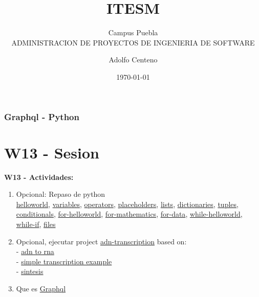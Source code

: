 \documentclass{beamer}
\begin{document}
\title{ITESM}  
\subtitle{Campus Puebla\\ADMINISTRACION DE PROYECTOS DE INGENIERIA DE SOFTWARE
}
\author{Adolfo Centeno}
\date{\today} 


\begin{frame}
\titlepage
\end{frame}

\begin{frame}\frametitle{Graphql - Python}
\tableofcontents
\end{frame} 


\section{W13 - Sesion }

\begin{frame}

    
\textbf{W13 - Actividades:}


\begin{enumerate}

\item
	Opcional: Repaso de python \\
	
    \href{https://github.com/adsoftsito/python/blob/master/w2/helloworld.py}{helloworld},
	\href{https://github.com/adsoftsito/python/blob/master/w2/variables.py}{variables},
	\href{https://github.com/adsoftsito/python/blob/master/w2/operators.py}{operators},
	\href{https://github.com/adsoftsito/python/blob/master/w2/placeholders.py}{placeholders},
	\href{https://github.com/adsoftsito/python/blob/master/w2/lists.py}{lists},
	\href{https://github.com/adsoftsito/python/blob/master/w3/dictionaries.py}{dictionaries},
	\href{https://github.com/adsoftsito/python/blob/master/w3/tuples.py}{tuples},
	\href{https://github.com/adsoftsito/python/blob/master/w3/conditionals.py}{conditionals},
	\href{https://github.com/adsoftsito/python/blob/master/w4/for-helloworld.py}{for-helloworld},
	\href{https://github.com/adsoftsito/python/blob/master/w4/for-math.py}{for-mathematics},
	\href{https://github.com/adsoftsito/python/blob/master/w4/for-data.py}{for-data},
	\href{https://github.com/adsoftsito/python/blob/master/w4/while-helloworld.py}{while-helloworld},
	\href{https://github.com/adsoftsito/python/blob/master/w4/while-conditional.py}{while-if},
	\href{https://github.com/adsoftsito/python/blob/master/w5/files.py}{files} 
	
\item
	Opcional, ejecutar project \href{https://github.com/adsoftsito/python/blob/master/w6/adnframes.py}{adn-transcription} based on:\\
	  - \href{https://www.youtube.com/watch?v=fA2Vp3qgfDM}{adn to rna} \\
      - \href{https://www.youtube.com/watch?v=iXNhQoLNtYo&t=382s}{simple transcription example} \\
      - \href{https://www.youtube.com/watch?v=VEy8TYGs4mA&t=478s}{sintesis}
\item
   Que es       
    \href{https://www.howtographql.com/basics/0-introduction/}{Graphql}


\end{enumerate}
\end{frame}
\end{document}
